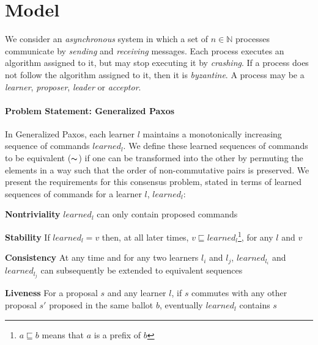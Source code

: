 \section{Model}
\label{sec:model}
%
We consider an \emph{asynchronous} system in which
a set of $n \in \mathbb{N}$ processes communicate by 
\emph{sending} and \emph{receiving} messages.
Each process executes an algorithm assigned to it, but may stop executing it by \emph{crashing}.
If a process does not follow the algorithm assigned to it, then it is \emph{byzantine}.
A process may be a \emph{learner}, \emph{proposer}, \emph{leader} or \emph{acceptor}.

\paragraph{Problem Statement: Generalized Paxos}
In Generalized Paxos, each learner $l$ maintains a monotonically increasing sequence of commands $learned_l$. 
We define these learned sequences of commands to be equivalent ($\thicksim$) 
if one can be transformed into the other by permuting the elements in a way such that the order of non-commutative pairs is preserved. 
We present the requirements for this consensus problem, stated in terms of learned sequences of commands for a learner $l$, $learned_l$:\par
\textbf{Nontriviality} $learned_l$ can only contain proposed commands \par
\textbf{Stability} If $learned_l = v$ then, at all later times, $v \sqsubseteq learned_l$\footnote{$a \sqsubseteq b$ means that $a$ is a prefix of $b$}, for any $l$ and $v$ \par
\textbf{Consistency} At any time and for any two learners $l_i$ and $l_j$, $learned_{l_i}$ and $learned_{l_j}$ can subsequently be extended to equivalent sequences\par
\textbf{Liveness} For a proposal $s$ and any learner $l$, if $s$ commutes with any other proposal $s'$ proposed in the same ballot $b$, eventually $learned_l$ contains $s$ \par
